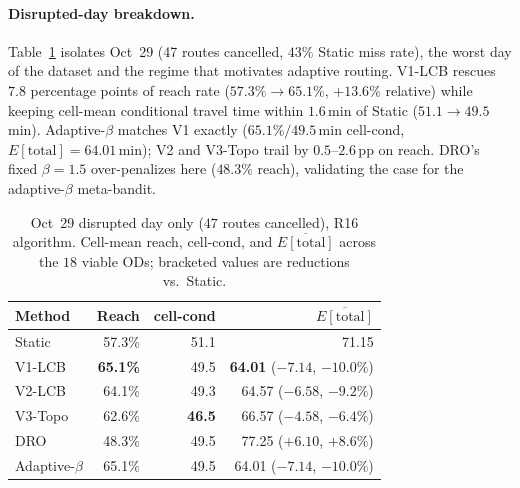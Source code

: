 \documentclass[11pt]{article}
\theoremstyle{definition}
\theoremstyle{remark}
\begin{document}
\paragraph{Disrupted-day breakdown.} Table~\ref{tab:swiss_oct29}
isolates Oct~29 (47 routes cancelled, $43\%$ Static miss rate), the
worst day of the dataset and the regime that motivates adaptive
routing. V1-LCB rescues $7.8$ percentage points of reach rate
($57.3\%\!\to\!65.1\%$, $+13.6\%$ relative) while keeping
cell-mean conditional travel time within $1.6$\,min of Static
($51.1\!\to\!49.5$\,min). Adaptive-$\beta$ matches V1 exactly
($65.1\%/49.5$\,min cell-cond, $E[\mathrm{total}]=64.01$\,min);
V2 and V3-Topo trail by $0.5$--$2.6$\,pp on reach. DRO's fixed
$\beta=1.5$ over-penalizes here ($48.3\%$ reach), validating the
case for the adaptive-$\beta$ meta-bandit.

\begin{table}[t]
\centering
\caption{Oct~29 disrupted day only ($47$ routes cancelled), R16
algorithm. Cell-mean reach, cell-cond, and
$\overline{E[\mathrm{total}]}$ across the $18$ viable ODs;
bracketed values are reductions vs.\ Static.}
\label{tab:swiss_oct29}
\begin{tabular}{l rrr}
\toprule
Method        & Reach & cell-cond & $\overline{E[\mathrm{total}]}$ \\
\midrule
Static            & 57.3\% & 51.1 & 71.15 \\
V1-LCB            & \textbf{65.1\%} & 49.5 & \textbf{64.01} ($-7.14$, $-10.0\%$) \\
V2-LCB            & 64.1\% & 49.3 & 64.57 ($-6.58$, $-9.2\%$) \\
V3-Topo           & 62.6\% & \textbf{46.5} & 66.57 ($-4.58$, $-6.4\%$) \\
DRO               & 48.3\% & 49.5 & 77.25 ($+6.10$, $+8.6\%$) \\
Adaptive-$\beta$  & 65.1\% & 49.5 & 64.01 ($-7.14$, $-10.0\%$) \\
\bottomrule
\end{tabular}
\end{table}
\end{document}

